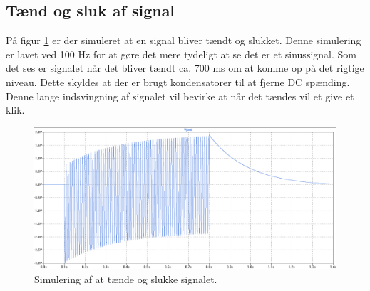 \subsection*{Tænd og sluk af signal}
På figur \ref{indgangsvaelger_taendsluk} er der simuleret at en signal bliver tændt og slukket. Denne simulering er lavet ved 100 Hz for at gøre det mere tydeligt at se det er et sinussignal. Som det ses er signalet når det bliver tændt ca. 700 ms om at komme op på det rigtige niveau. Dette skyldes at der er brugt kondensatorer til at fjerne DC spænding. Denne lange indsvingning af signalet vil bevirke at når det tændes vil et give et klik. 
\begin{figure}[h]
\centering
\includegraphics[scale=0.3]{teknisk/indgangsvaelger/simulering/taend_sluk.png}
\caption{Simulering af at tænde og slukke signalet.}
\label{indgangsvaelger_taendsluk}
\end{figure}
